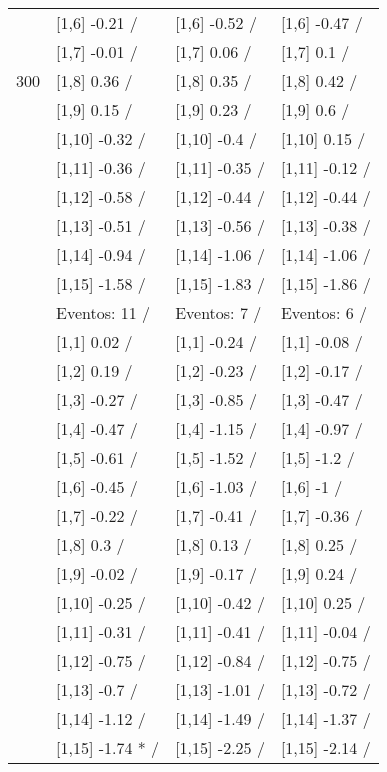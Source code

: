 \begin{table}
\begin{tabular}[t]{llll}
 & {}[1,6] -0.21  / & {}[1,6] -0.52  / & {}[1,6] -0.47  /\\
 & {}[1,7] -0.01  / & {}[1,7] 0.06  / & {}[1,7] 0.1  /\\
300 & {}[1,8] 0.36  / & {}[1,8] 0.35  / & {}[1,8] 0.42  /\\
\addlinespace
 & {}[1,9] 0.15  / & {}[1,9] 0.23  / & {}[1,9] 0.6  /\\
 & {}[1,10] -0.32  / & {}[1,10] -0.4  / & {}[1,10] 0.15  /\\
 & {}[1,11] -0.36  / & {}[1,11] -0.35  / & {}[1,11] -0.12  /\\
 & {}[1,12] -0.58  / & {}[1,12] -0.44  / & {}[1,12] -0.44  /\\
 & {}[1,13] -0.51  / & {}[1,13] -0.56  / & {}[1,13] -0.38  /\\
\addlinespace
 & {}[1,14] -0.94  / & {}[1,14] -1.06  / & {}[1,14] -1.06  /\\
 & {}[1,15] -1.58  / & {}[1,15] -1.83  / & {}[1,15] -1.86  /\\
 & Eventos:  11 / & Eventos:  7 / & Eventos:  6 /\\
 & {}[1,1] 0.02  / & {}[1,1] -0.24  / & {}[1,1] -0.08  /\\
 & {}[1,2] 0.19  / & {}[1,2] -0.23  / & {}[1,2] -0.17  /\\
\addlinespace
 & {}[1,3] -0.27  / & {}[1,3] -0.85  / & {}[1,3] -0.47  /\\
 & {}[1,4] -0.47  / & {}[1,4] -1.15  / & {}[1,4] -0.97  /\\
 & {}[1,5] -0.61  / & {}[1,5] -1.52  / & {}[1,5] -1.2  /\\
 & {}[1,6] -0.45  / & {}[1,6] -1.03  / & {}[1,6] -1  /\\
 & {}[1,7] -0.22  / & {}[1,7] -0.41  / & {}[1,7] -0.36  /\\
\addlinespace
500 & {}[1,8] 0.3  / & {}[1,8] 0.13  / & {}[1,8] 0.25  /\\
 & {}[1,9] -0.02  / & {}[1,9] -0.17  / & {}[1,9] 0.24  /\\
 & {}[1,10] -0.25  / & {}[1,10] -0.42  / & {}[1,10] 0.25  /\\
 & {}[1,11] -0.31  / & {}[1,11] -0.41  / & {}[1,11] -0.04  /\\
 & {}[1,12] -0.75  / & {}[1,12] -0.84  / & {}[1,12] -0.75  /\\
\addlinespace
 & {}[1,13] -0.7  / & {}[1,13] -1.01  / & {}[1,13] -0.72  /\\
 & {}[1,14] -1.12  / & {}[1,14] -1.49  / & {}[1,14] -1.37  /\\
 & {}[1,15] -1.74 * / & {}[1,15] -2.25  / & {}[1,15] -2.14  /\\
\bottomrule
\end{tabular}
\end{table}
